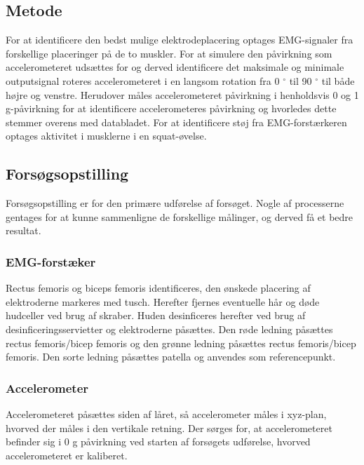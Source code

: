 \subsection{Metode}
For at identificere den bedst mulige elektrodeplacering optages EMG-signaler fra forskellige placeringer på de to muskler. 
For at simulere den påvirkning som accelerometeret udsættes for og derved identificere det maksimale og minimale outputsignal roteres accelerometeret i en langsom rotation fra 0 $^{\circ}$ til 90 $^{\circ}$  til både højre og venstre. Herudover måles accelerometeret påvirkning i henholdsvis 0 og 1 g-påvirkning for at identificere accelerometeres påvirkning og hvorledes dette stemmer overens med databladet. 
For at identificere støj fra EMG-forstærkeren optages aktivitet i musklerne i en squat-øvelse.


\subsection{Forsøgsopstilling}
Forsøgsopstilling er for den primære udførelse af forsøget. Nogle af processerne gentages for at kunne sammenligne de forskellige målinger, og derved få et bedre resultat.


\subsubsection{EMG-forstæker}
Rectus femoris og biceps femoris identificeres, den ønskede placering af elektroderne markeres med tusch. Herefter fjernes eventuelle hår og døde hudceller ved brug af skraber. Huden desinficeres herefter ved brug af desinficeringsservietter og elektroderne påsættes. Den røde ledning påsættes rectus femoris/bicep femoris og den grønne ledning påsættes rectus femoris/bicep femoris. Den sorte ledning påsættes patella og anvendes som referencepunkt.


\subsubsection{Accelerometer}
Accelerometeret påsættes siden af låret, så accelerometer måles i xyz-plan, hvorved der måles i den vertikale retning. Der sørges for,  at accelerometeret befinder sig i 0 g påvirkning ved starten af forsøgets udførelse, hvorved accelerometeret er kaliberet. 

